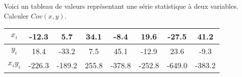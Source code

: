 \documentclass[11pt]{article}
\begin{document}
\begin{exercice}[3][Covariance]
Voici un tableau de valeurs représentant une série statistique à deux
variables. Calculer $Cov(x,y)$.
\begin{center}
\begin{tabular}{|c|c|c|c|c|c|c|c|}
\hline
$x_i$ & -12.3 & 5.7 & 34.1 & -8.4 & 19.6 & -27.5 & 41.2 \\ \hline
$y_i$ & 18.4 & -33.2 & 7.5 & 45.1 & -12.9 & 23.6 & -9.3 \\ \hline
$x_iy_i$ & -226.3 & -189.2 & 255.8 & -378.8 & -252.8 & -649.0 & -383.2 \\ \hline
\end{tabular}
\end{center}
\end{exercice}
\end{document}
